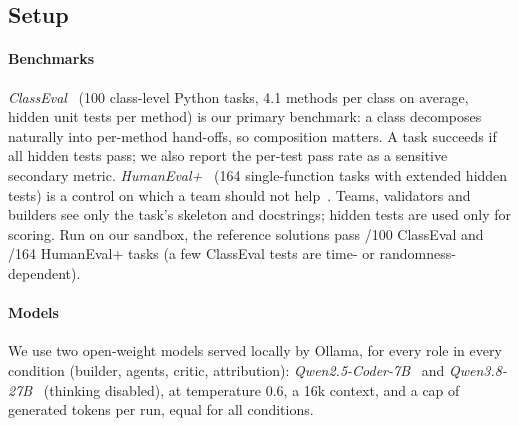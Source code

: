\documentclass[10pt,conference]{IEEEtran}
\theoremstyle{definition}
\begin{document}
\subsection{Setup}\label{sec:setup}

\paragraph*{Benchmarks} \emph{ClassEval}~\cite{du2024classeval} (100
class-level Python tasks, 4.1 methods per class on average, hidden unit tests
per method) is our primary benchmark: a class decomposes naturally into
per-method hand-offs, so composition matters. A task succeeds if all hidden
tests pass; we also report the per-test pass rate as a sensitive secondary
metric. \emph{HumanEval+}~\cite{chen2021codex,liu2023evalplus} (164
single-function tasks with extended hidden tests) is a control on which a
team should not help~\cite{kim2025scaling}. Teams, validators and builders
see only the task's skeleton and docstrings; hidden tests are used only for
scoring. Run on our sandbox, the reference solutions pass
\nCanonCE/100 ClassEval and \nCanonHE/164 HumanEval+ tasks (a few ClassEval
tests are time- or randomness-dependent).

\paragraph*{Models} We use two open-weight models served locally by Ollama,
for every role in every condition (builder, agents, critic, attribution):
\emph{Qwen2.5-Coder-7B}~\cite{hui2024qwen25coder} and
\emph{Qwen3.8-27B}~\cite{qwen2025qwen3} (thinking disabled), at temperature
0.6, a 16k context, and a cap of \nBudget{} generated tokens per run, equal
for all conditions.
\end{document}
